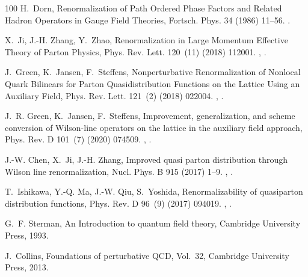 \begin{thebibliography}{100}
H.~Dorn, {Renormalization of Path Ordered Phase Factors and Related Hadron
  Operators in Gauge Field Theories}, Fortsch. Phys. 34 (1986) 11--56.
\newblock \href {https://doi.org/10.1002/prop.19860340104}
  {}.

X.~Ji, J.-H. Zhang, Y.~Zhao, {Renormalization in Large Momentum Effective
  Theory of Parton Physics}, Phys. Rev. Lett. 120~(11) (2018) 112001.
\newblock \href {http://arxiv.org/abs/1706.08962} {},
  \href {https://doi.org/10.1103/PhysRevLett.120.112001}
  {}.

J.~Green, K.~Jansen, F.~Steffens, {Nonperturbative Renormalization of Nonlocal
  Quark Bilinears for Parton Quasidistribution Functions on the Lattice Using
  an Auxiliary Field}, Phys. Rev. Lett. 121~(2) (2018) 022004.
\newblock \href {http://arxiv.org/abs/1707.07152} {},
  \href {https://doi.org/10.1103/PhysRevLett.121.022004}
  {}.

J.~R. Green, K.~Jansen, F.~Steffens, {Improvement, generalization, and scheme
  conversion of Wilson-line operators on the lattice in the auxiliary field
  approach}, Phys. Rev. D 101~(7) (2020) 074509.
\newblock \href {http://arxiv.org/abs/2002.09408} {},
  \href {https://doi.org/10.1103/PhysRevD.101.074509}
  {}.

J.-W. Chen, X.~Ji, J.-H. Zhang, {Improved quasi parton distribution through
  Wilson line renormalization}, Nucl. Phys. B 915 (2017) 1--9.
\newblock \href {http://arxiv.org/abs/1609.08102} {},
  \href {https://doi.org/10.1016/j.nuclphysb.2016.12.004}
  {}.

T.~Ishikawa, Y.-Q. Ma, J.-W. Qiu, S.~Yoshida, {Renormalizability of quasiparton
  distribution functions}, Phys. Rev. D 96~(9) (2017) 094019.
\newblock \href {http://arxiv.org/abs/1707.03107} {},
  \href {https://doi.org/10.1103/PhysRevD.96.094019}
  {}.

G.~F. Sterman, {An Introduction to quantum field theory}, Cambridge University
  Press, 1993.

J.~Collins, {Foundations of perturbative QCD}, Vol.~32, Cambridge University
  Press, 2013.


\end{thebibliography}
